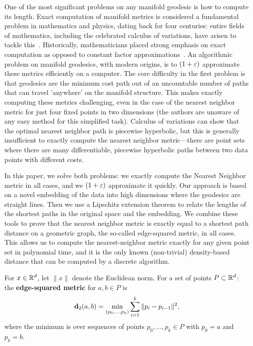 One of the most significant problems on any manifold geodesic is how to
compute its length.  Exact computation of manifold metrics is considered a
fundamental problem in mathematics and physics, dating back for four
centuries: entire fields of mathematics, including the celebrated calculus
of variations, have arisen to tackle this~\cite{Courant53}. Historically,
mathematicians placed strong emphasis on exact computation as opposed to
constant factor approximations~\cite{Courant53}. An algorithmic problem on manifold
geodesics, with modern origins, is to $(1+\varepsilon)$ approximate these metrics
efficiently on a computer.  The core difficulty in the first problem is
that geodesics are the minimum cost path out of an uncountable number of
paths that can travel 'anywhere' on the manifold structure.  This makes
exactly computing these metrics challenging, even in the case of the
nearest neighbor metric for just four fixed points in two dimensions (the
authors are unaware of any easy method for this simplified task).
Calculus of variations can show that the optimal nearest neighbor path is
piecewise hyperbolic, but this is generally insufficient to exactly compute
the nearest neighbor metric---there are point sets where there are
many differentiable, piecewise hyperbolic paths between two data points with
different costs.


In this paper, we solve both problems: we exactly compute the Nearest
Neighbor metric in all cases, and we $(1+\varepsilon)$ approximate it quickly.
Our approach is based on a novel embedding of the data into high dimensions where the geodesics are straight lines.
Then we use a Lipschitz extension theorem to relate the lengths of the shortest paths in the original space and the embedding.
We combine these tools to prove that the nearest neighbor metric is exactly equal to a shortest path distance on a geometric graph, the so-called edge-squared metric, in all cases.
This allows us to compute the nearest-neighbor metric exactly for any given point set in polynomial time, and it is the only known (non-trivial) density-based distance that can be computed by a discrete algorithm.

  \begin{definition}
For $x\in \mathbb{R}^d$, let $\|x\|$ denote the Euclidean norm.
  For a set of points $P\subset \mathbb{R}^d$:
  the \textbf{edge-squared metric} for $a,b\in P$ is
  \[
    \mathbf{d}_2(a,b) = \min_{(p_0,\ldots, p_k)}\sum_{i=1}^k \|p_i - p_{i-1}\|^2,
  \]
  where the minimum is over sequences of points $p_0,\ldots, p_k\in P$ with $p_0 = a$ and $p_k = b$.
  \end{definition}

